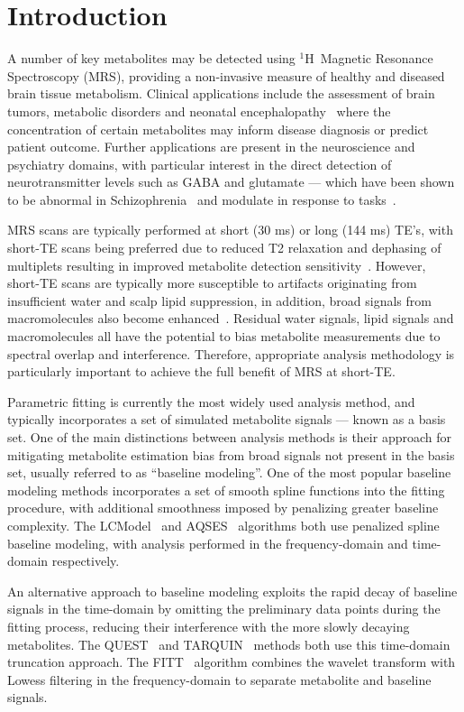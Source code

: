\documentclass[num-refs]{wiley-article}
\newcommand{\proton}{\ensuremath{^1\mathrm{H}}}
\begin{document}
\section{Introduction}
A number of key metabolites may be detected using \proton\ Magnetic Resonance Spectroscopy (MRS), providing a non-invasive measure of healthy and diseased brain tissue metabolism. Clinical applications include the assessment of brain tumors, metabolic disorders and neonatal encephalopathy~\cite{Oz2014,Lally2019} where the concentration of certain metabolites may inform disease diagnosis or predict patient outcome. Further applications are present in the neuroscience and psychiatry domains, with particular interest in the direct detection of neurotransmitter levels such as GABA and glutamate --- which have been shown to be abnormal in Schizophrenia~\cite{Merritt2016} and modulate in response to tasks~\cite{Jelen2018,Chen2017}.

MRS scans are typically performed at short (30 ms) or long (144 ms) TE's, with short-TE scans being preferred due to reduced T2 relaxation and dephasing of multiplets resulting in improved metabolite detection sensitivity~\cite{Wilson2019}. However, short-TE scans are typically more susceptible to artifacts originating from insufficient water and scalp lipid suppression, in addition, broad signals from macromolecules also become enhanced~\cite{Cudalbu2012}. Residual water signals, lipid signals and macromolecules all have the potential to bias metabolite measurements due to spectral overlap and interference. Therefore, appropriate analysis methodology is particularly important to achieve the full benefit of MRS at short-TE.

Parametric fitting is currently the most widely used analysis method, and typically incorporates a set of simulated metabolite signals --- known as a basis set. One of the main distinctions between analysis methods is their approach for mitigating metabolite estimation bias from broad signals not present in the basis set, usually referred to as ``baseline modeling''. One of the most popular baseline modeling methods incorporates a set of smooth spline functions into the fitting procedure, with additional smoothness imposed by penalizing greater baseline complexity. The LCModel~\cite{Provencher1993} and AQSES~\cite{Poullet2007} algorithms both use penalized spline baseline modeling, with analysis performed in the frequency-domain and time-domain respectively.

An alternative approach to baseline modeling exploits the rapid decay of baseline signals in the time-domain by omitting the preliminary data points during the fitting process, reducing their interference with the more slowly decaying metabolites. The QUEST~\cite{Ratiney2005} and TARQUIN~\cite{Wilson2011} methods both use this time-domain truncation approach. The FITT~\cite{Young1998} algorithm combines the wavelet transform with Lowess filtering in the frequency-domain to separate metabolite and baseline signals.
\end{document}
